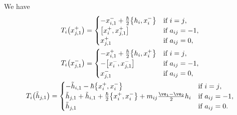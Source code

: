 \begin{prop}\label{prop:formula2}We have
\begin{gather*}
T_i\big(x_{j,1}^+\big) = \begin{cases}
-x_{i,1}^- + \tfrac{\hbar}{2}\big\{ h_i, x_i^- \big\} & \text{if $i=j$},\\
\big[x_i^+,x_{j,1}^+\big] & \text{if $a_{ij}=-1$},\\
x_{j,1}^+ & \text{if $a_{ij}=0$},
\end{cases} \\
T_i\big(x_{j,1}^-\big) = \begin{cases}
-x_{i,1}^+ + \tfrac{\hbar}{2}\big\{ h_i, x_i^+ \big\} & \text{if $i=j$},\\
-\big[x_{i}^-,x_{j,1}^-\big] & \text{if $a_{ij}=-1$},\\
x_{j,1}^- & \text{if $a_{ij}=0$},
\end{cases}
\\
T_i\big(\tilde{h}_{j,1}\big) = \begin{cases}
-\tilde{h}_{i,1} - \hbar \big\{ x_i^+,x_i^- \big\} & \text{if $i=j$},\\
\tilde{h}_{j,1} + \tilde{h}_{i,1} + \tfrac{\hbar}{2} \big\{ x_i^+,x_i^- \big\} + m_{ij}\tfrac{\ve_1 - \ve_2}{2} h_i & \text{if $a_{ij}=-1$},\\
\tilde{h}_{j,1} & \text{if $a_{ij}=0$}.
\end{cases}
\end{gather*}
\end{prop}

